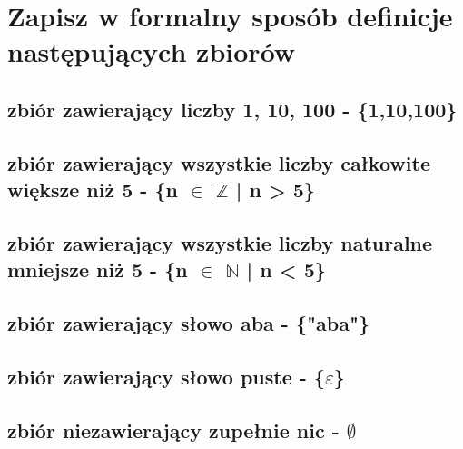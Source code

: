 \documentclass{article}
\begin{document}
\newpage
\section{Zapisz w formalny sposób definicje następujących zbiorów}
\subsection{zbiór zawierający liczby 1, 10, 100 - \{1,10,100\}} 
\subsection{zbiór zawierający wszystkie liczby całkowite większe niż 5 - \{n $\in$ $\mathbb{Z}$ | n > 5\}} 
\subsection{zbiór zawierający wszystkie liczby naturalne mniejsze niż 5 - \{n $\in$ $\mathbb{N}$ | n < 5\}} 
\subsection{zbiór zawierający słowo aba - \{"aba"\}}
\subsection{zbiór zawierający słowo puste - \{\( \varepsilon \)\}}
\subsection{zbiór niezawierający zupełnie nic - \( \emptyset \)}
\end{document}
